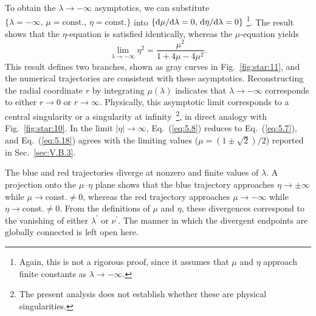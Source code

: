 \documentclass[aps,prd,twocolumn]{revtex4-2}
\newcommand\dx{{\rm d}}
\begin{document}
To obtain the $\lambda\rightarrow-\infty$ asymptotics, we can substitute $\{\lambda=-\infty,\,\mu=\mathrm{const.},\,\eta=\mathrm{const.}\}$ into $\{\dx\mu/\dx\lambda=0,\,\dx\eta/\dx\lambda=0\}$ \footnote{Again, this is not a rigorous proof, since it assumes that $\mu$ and $\eta$ approach finite constants as $\lambda\rightarrow-\infty$.}. The result shows that the $\eta$-equation is satisfied identically, whereas the $\mu$-equation yields
\begin{equation}\label{eq:5.18}
  \lim_{\lambda\rightarrow-\infty} \eta^2 = \frac{\mu^2}{1+4\mu-4\mu^2}.
\end{equation}
This result defines two branches, shown as gray curves in Fig.~\ref{fig:star:11}, and the numerical trajectories are consistent with these asymptotics. Reconstructing the radial coordinate $r$ by integrating $\mu(\lambda)$ indicates that $\lambda\rightarrow-\infty$ corresponds to either $r\rightarrow0$ or $r\rightarrow\infty$. Physically, this asymptotic limit corresponds to a central singularity or a singularity at infinity~\footnote{The present analysis does not establish whether these are physical singularities.}, in direct analogy with Fig.~\ref{fig:star:10}. In the limit $|\eta|\rightarrow\infty$, Eq.~(\ref{eq:5.8}) reduces to Eq.~(\ref{eq:5.7}), and Eq.~(\ref{eq:5.18}) agrees with the limiting values ($\mu=(1\pm\sqrt{2})/2$) reported in Sec.~\ref{sec:V.B.3}.

The blue and red trajectories diverge at nonzero and finite values of $\lambda$. A projection onto the $\mu$--$\eta$ plane \cite{NotShown} shows that the blue trajectory approaches $\eta\rightarrow\pm\infty$ while $\mu\rightarrow\mathrm{const.}\neq0$, whereas the red trajectory approaches $\mu\rightarrow-\infty$ while $\eta\rightarrow\mathrm{const.}\neq0$. From the definitions of $\mu$ and $\eta$, these divergences correspond to the vanishing of either $\lambda^\prime$ or $\nu^\prime$. The manner in which the divergent endpoints are globally connected is left open here.
\end{document}

